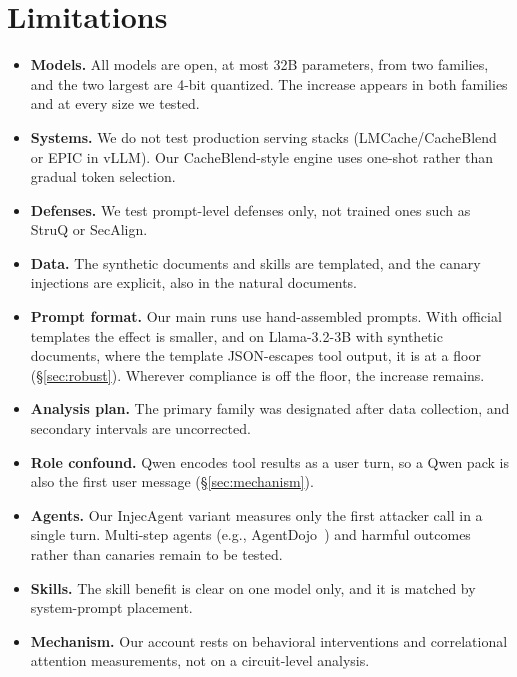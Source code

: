 \documentclass[10pt]{article}
\begin{document}
\section{Limitations}\label{sec:limitations}
\begin{itemize}
\item \textbf{Models.} All models are open, at most 32B parameters, from two families, and the two largest are 4-bit quantized.
  The increase appears in both families and at every size we tested.
\item \textbf{Systems.} We do not test production serving stacks (LMCache/CacheBlend or EPIC in vLLM). Our CacheBlend-style engine
  uses one-shot rather than gradual token selection.
\item \textbf{Defenses.} We test prompt-level defenses only, not trained ones such as StruQ or SecAlign.
\item \textbf{Data.} The synthetic documents and skills are templated, and the canary injections are explicit, also in the natural
  documents.
\item \textbf{Prompt format.} Our main runs use hand-assembled prompts. With official templates the effect is smaller, and on
  Llama-3.2-3B with synthetic documents, where the template JSON-escapes tool output, it is at a floor (\S\ref{sec:robust}). Wherever compliance is off the floor, the increase remains.
\item \textbf{Analysis plan.} The primary family was designated after data collection, and secondary intervals are uncorrected.
\item \textbf{Role confound.} Qwen encodes tool results as a user turn, so a Qwen pack is also the first user message
  (\S\ref{sec:mechanism}).
\item \textbf{Agents.} Our InjecAgent variant measures only the first attacker call in a single turn. Multi-step agents (e.g.,
  AgentDojo~\citep{debenedetti2024agentdojo}) and harmful outcomes rather than canaries remain to be tested.
\item \textbf{Skills.} The skill benefit is clear on one model only, and it is matched by system-prompt placement.
\item \textbf{Mechanism.} Our account rests on behavioral interventions and correlational attention measurements, not on a
  circuit-level analysis.
\end{itemize}
\end{document}
